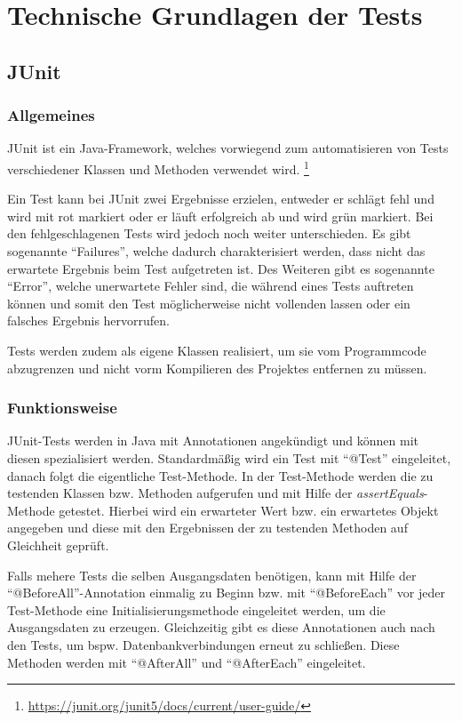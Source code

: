 \section{Technische Grundlagen der Tests}
\authorsection{\authorRF}

\subsection{JUnit}

\subsubsection{Allgemeines}

JUnit ist ein Java-Framework, welches vorwiegend zum automatisieren von Tests verschiedener Klassen und Methoden verwendet wird. \footnote{\url{https://junit.org/junit5/docs/current/user-guide/}}

Ein Test kann bei JUnit zwei Ergebnisse erzielen, entweder er schlägt fehl und wird mit rot markiert oder er läuft erfolgreich ab und wird grün markiert.
Bei den fehlgeschlagenen Tests wird jedoch noch weiter unterschieden. 
Es gibt sogenannte \enquote{Failures}, welche dadurch charakterisiert werden, dass nicht das erwartete Ergebnis beim Test aufgetreten ist.
Des Weiteren gibt es sogenannte \enquote{Error}, welche unerwartete Fehler sind, die während eines Tests auftreten können und somit den Test möglicherweise nicht vollenden lassen oder ein falsches Ergebnis hervorrufen.

Tests werden zudem als eigene Klassen realisiert, um sie vom Programmcode abzugrenzen und nicht vorm Kompilieren des Projektes entfernen zu müssen.

\subsubsection{Funktionsweise}

JUnit-Tests werden in Java mit Annotationen angekündigt und können mit diesen spezialisiert werden.
Standardmäßig wird ein Test mit \enquote{@Test} eingeleitet, danach folgt die eigentliche Test-Methode.
In der Test-Methode werden die zu testenden Klassen bzw. Methoden aufgerufen und mit Hilfe der \textit{assertEquals}-Methode getestet.
Hierbei wird ein erwarteter Wert bzw. ein erwartetes Objekt angegeben und diese mit den Ergebnissen der zu testenden Methoden auf Gleichheit geprüft.

Falls mehere Tests die selben Ausgangsdaten benötigen, kann mit Hilfe der \enquote{@BeforeAll}-Annotation einmalig zu Beginn bzw. mit \enquote{@BeforeEach} vor jeder Test-Methode eine Initialisierungsmethode eingeleitet werden, um die Ausgangsdaten zu erzeugen.
Gleichzeitig gibt es diese Annotationen auch nach den Tests, um bspw. Datenbankverbindungen erneut zu schließen. Diese Methoden werden mit \enquote{@AfterAll} und \enquote{@AfterEach} eingeleitet.

